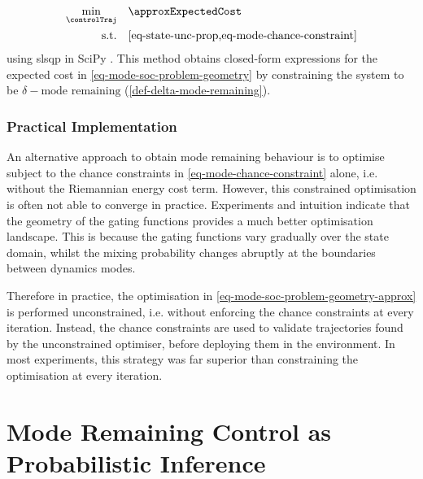 \documentclass{mimosis-class/mimosis}
\numberwithin{equation}{chapter}
\newcommand{\state}{\ensuremath{\mathbf{x}}}
\newcommand{\control}{\ensuremath{\mathbf{u}}}
\newcommand{\modeVar}{\ensuremath{\alpha}}
\begin{document}
{\begin{subequations} \label{eq-mode-soc-problem-geometry-approx}
\begin{align}
\min_{\controlTraj} & \quad \approxExpectedCost \\
\text{s.t.}& \quad \text{\cref{eq-state-unc-prop,eq-mode-chance-constraint}}
\end{align}
\end{subequations}
using \acrshort{slsqp} in SciPy \citep{2020SciPy-NMeth}.
This method obtains closed-form expressions for the expected cost in \cref{eq-mode-soc-problem-geometry}
by constraining the system to be \(\delta-\text{mode remaining}\) (\cref{def-delta-mode-remaining}).

\subsubsection{Practical Implementation}
\label{sec:org10d9dec}
An alternative approach to obtain mode remaining behaviour is to optimise subject to the chance constraints
in \cref{eq-mode-chance-constraint} alone, i.e. without the Riemannian energy cost term.
However, this constrained optimisation is often not able to converge in practice.
Experiments and intuition indicate that the geometry of the gating functions provides a much
better optimisation landscape.
This is because the gating functions vary gradually over the state domain, whilst the mixing probability changes
abruptly at the boundaries between dynamics modes.

Therefore in practice, the optimisation in \cref{eq-mode-soc-problem-geometry-approx}
is performed unconstrained, i.e. without enforcing the chance constraints at every iteration.
Instead, the chance constraints are used to validate trajectories found by the unconstrained
optimiser, before deploying them in the environment.
In most experiments, this strategy was far superior than constraining the optimisation at every iteration.

\section{Mode Remaining Control as Probabilistic Inference \label{chap-traj-opt-inference}}
\label{sec:org98a7549}
\newcommand{\startStateDist}{\ensuremath{p(\state_{1})}}
\newcommand{\transitionDist}{\ensuremath{p(\state_{\timeInd+1} \mid \state_\timeInd, \control_\timeInd, \modeVar_{\timeInd}=\desiredMode)}}
\renewcommand{\controlDist}{\ensuremath{\policy(\control_\timeInd \mid \state_\timeInd)}}


}
\end{document}

